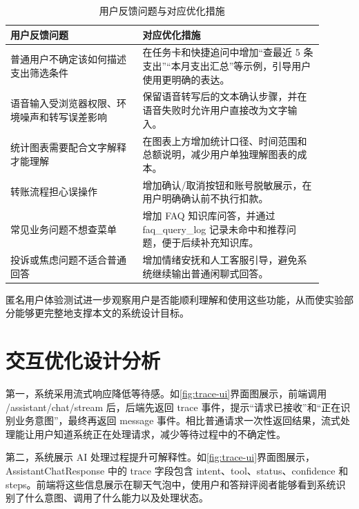 \documentclass[bachelor, print]{xduthesis}
\begin{document}
\begin{table}[H]
    \centering
    \caption{用户反馈问题与对应优化措施}
    \label{tab:user-feedback-optimization}
    \small
    \setlength{\tabcolsep}{4pt}
    \begin{tabular}{|p{0.38\linewidth}|p{0.52\linewidth}|}
        \hline
        用户反馈问题 & 对应优化措施 \\
        \hline
        普通用户不确定该如何描述支出筛选条件 & 在任务卡和快捷追问中增加“查最近 5 条支出”“本月支出汇总”等示例，引导用户使用更明确的表达。 \\
        \hline
        语音输入受浏览器权限、环境噪声和转写误差影响 & 保留语音转写后的文本确认步骤，并在语音失败时允许用户直接改为文字输入。 \\
        \hline
        统计图表需要配合文字解释才能理解 & 在图表上方增加统计口径、时间范围和总额说明，减少用户单独理解图表的成本。 \\
        \hline
        转账流程担心误操作 & 增加确认/取消按钮和账号脱敏展示，在用户明确确认前不执行扣款。 \\
        \hline
        常见业务问题不想查菜单 & 增加 FAQ 知识库问答，并通过 faq\_query\_log 记录未命中和推荐问题，便于后续补充知识库。 \\
        \hline
        投诉或焦虑问题不适合普通回答 & 增加情绪安抚和人工客服引导，避免系统继续输出普通闲聊式回答。 \\
        \hline
    \end{tabular}
\end{table}

匿名用户体验测试进一步观察用户是否能顺利理解和使用这些功能，从而使实验部分能够更完整地支撑本文的系统设计目标。

\section{交互优化设计分析}

第一，系统采用流式响应降低等待感。如\ref{fig:trace-ui}界面图展示，前端调用 /assistant/chat/stream 后，后端先返回 trace 事件，提示“请求已接收”和“正在识别业务意图”，最终再返回 message 事件。相比普通请求一次性返回结果，流式处理能让用户知道系统正在处理请求，减少等待过程中的不确定性。

第二，系统展示 AI 处理过程提升可解释性。如\ref{fig:trace-ui}界面图展示，AssistantChatResponse 中的 trace 字段包含 intent、tool、status、confidence 和 steps。前端将这些信息展示在聊天气泡中，使用户和答辩评阅者能够看到系统识别了什么意图、调用了什么能力以及处理状态。
\end{document}

